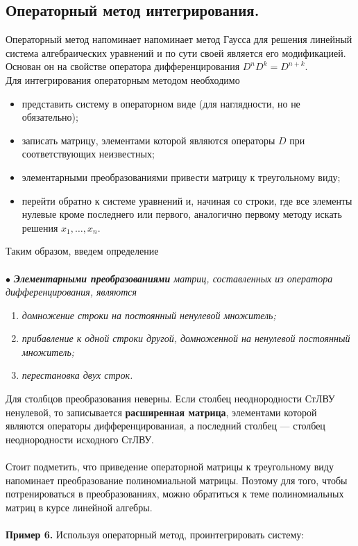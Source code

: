 \documentclass[a4paper, 12pt]{article}
\begin{document}
\subsection*{Операторный метод интегрирования.}
Операторный метод напоминает напоминает метод Гаусса для решения линейный система алгебраических уравнений и по сути своей является его модификацией. Основан он на свойстве оператора дифференцирования $D^nD^k = D^{n+k}$.\\
Для интегрирования операторным методом необходимо \begin{itemize}
	\item представить систему в операторном виде (для наглядности, но не обязательно);
	\item записать матрицу, элементами которой являются операторы $D$ при соответствующих неизвестных;
	\item элементарными преобразованиями привести матрицу к треугольному виду;
	\item перейти обратно к системе уравнений и, начиная со строки, где все элементы нулевые кроме последнего или первого, аналогично первому методу искать решения $x_1,\ldots,x_n$.
\end{itemize} Таким образом, введем определение\\\\
$\bullet$ \textit{\textbf{Элементарными преобразованиями} матриц, составленных из оператора дифференцирования, являются}\begin{enumerate}
	\item \textit{домножение строки на постоянный ненулевой множитель;}
	\item \textit{прибавление к одной строки другой, домноженной на ненулевой постоянный множитель;}
	\item\textit{ перестановка двух строк.}
\end{enumerate} 
Для столбцов преобразования неверны. Если столбец неоднородности СтЛВУ ненулевой, то записывается \textbf{расширенная матрица}, элементами которой являются операторы дифференцированиая, а последний столбец --- столбец неоднородности исходного СтЛВУ.\\\\
Стоит подметить, что приведение операторной матрицы к треугольному виду напоминает преобразование полиномиальной матрицы. Поэтому для того, чтобы потренироваться в преобразованиях, можно обратиться к теме полиномиальных матриц в курсе линейной алгебры.\\\\
\textbf{Пример 6.} Используя операторный метод, проинтегрировать систему:
\end{document}
